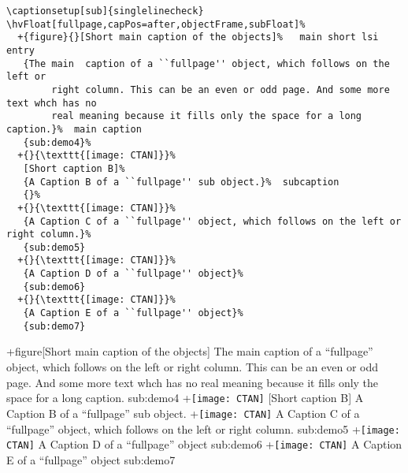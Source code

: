 \documentclass[twocolumn]{scrartcl}
\begin{document}
\blinddocument


\begin{lstlisting}
\captionsetup[sub]{singlelinecheck}
\hvFloat[fullpage,capPos=after,objectFrame,subFloat]%
  +{figure}{}[Short main caption of the objects]%   main short lsi entry
   {The main  caption of a ``fullpage'' object, which follows on the left or
        right column. This can be an even or odd page. And some more text whch has no
        real meaning because it fills only the space for a long caption.}%  main caption
   {sub:demo4}%
  +{}{\texttt{[image: CTAN]}}%
   [Short caption B]%
   {A Caption B of a ``fullpage'' sub object.}%  subcaption
   {}%
  +{}{\texttt{[image: CTAN]}}%
   {A Caption C of a ``fullpage'' object, which follows on the left or right column.}%
   {sub:demo5}
  +{}{\texttt{[image: CTAN]}}%
   {A Caption D of a ``fullpage'' object}%
   {sub:demo6}
  +{}{\texttt{[image: CTAN]}}%
   {A Caption E of a ``fullpage'' object}%
   {sub:demo7}
\end{lstlisting}

\Float[subfloat]
\captionsetup[sub]{singlelinecheck}
\hvFloat[fullpage,capPos=after,objectFrame,subFloat]%
  +{figure}{}[Short main caption of the objects]%
   {The main  caption of a ``fullpage'' object, which follows on the left or
        right column. This can be an even or odd page. And some more text whch has no
        real meaning because it fills only the space for a long caption.}%
   {sub:demo4}%
  +{}{\texttt{[image: CTAN]}}%
   [Short caption B]%
   {A Caption B of a ``fullpage'' sub object.}%
   {}%
  +{}{\texttt{[image: CTAN]}}%
   {A Caption C of a ``fullpage'' object, which follows on the left or right column.}%
   {sub:demo5}
  +{}{\texttt{[image: CTAN]}}%
   {A Caption D of a ``fullpage'' object}%
   {sub:demo6}
  +{}{\texttt{[image: CTAN]}}%
   {A Caption E of a ``fullpage'' object}%
   {sub:demo7}



\blinddocument

\Blindtext

\blindtext
\end{document}
